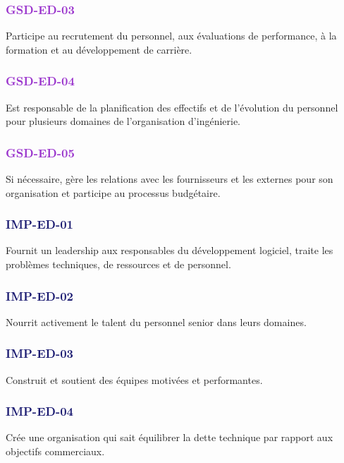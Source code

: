 \documentclass[a4paper, french, openany, 12pt]{book}
\newcommand\str[1]{\textcolor{DarkOrchid}{\textbf{\uppercase{gsd-{#1}}}}}
\newcommand\wis[1]{\textcolor{MidnightBlue}{\textbf{\uppercase{imp-{#1}}}}}
\begin{document}
\begin{multicols}{2}
  \subsubsection*{\str{ed-03}}

  Participe au recrutement du personnel, aux évaluations de performance, à la formation et au développement de carrière. 

  \subsubsection*{\str{ed-04}}

  Est responsable de la planification des effectifs et de l'évolution du personnel pour plusieurs domaines de 
  l'organisation d'ingénierie.

  \subsubsection*{\str{ed-05}}

  Si nécessaire, gère les relations avec les fournisseurs et les externes pour son organisation et participe au processus 
  budgétaire.

  \subsubsection*{\wis{ed-01}}

  Fournit un leadership aux responsables du développement logiciel, traite les problèmes techniques, de ressources et de 
  personnel.

  \subsubsection*{\wis{ed-02}}

  Nourrit activement le talent du personnel senior dans leurs domaines.

  \subsubsection*{\wis{ed-03}}

  Construit et soutient des équipes motivées et performantes.

  \subsubsection*{\wis{ed-04}}

  Crée une organisation qui sait équilibrer la dette technique par rapport aux objectifs commerciaux.


\end{multicols}
\end{document}
